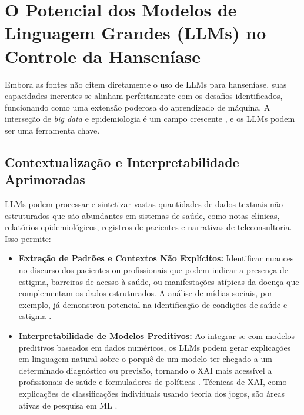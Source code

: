 \documentclass{article}
\begin{document}
\section{O Potencial dos Modelos de Linguagem Grandes (LLMs) no Controle da Hanseníase}
Embora as fontes não citem diretamente o uso de LLMs para hanseníase, suas capacidades inerentes se alinham perfeitamente com os desafios identificados, funcionando como uma extensão poderosa do aprendizado de máquina. A interseção de \textit{big data} e epidemiologia é um campo crescente \cite{tang2021intersection, goldstein2020convergence}, e os LLMs podem ser uma ferramenta chave.

\subsection{Contextualização e Interpretabilidade Aprimoradas}
LLMs podem processar e sintetizar vastas quantidades de dados textuais não estruturados que são abundantes em sistemas de saúde, como notas clínicas, relatórios epidemiológicos, registros de pacientes e narrativas de teleconsultoria. Isso permite:
\begin{itemize}
    \item \textbf{Extração de Padrões e Contextos Não Explícitos:} Identificar nuances no discurso dos pacientes ou profissionais que podem indicar a presença de estigma, barreiras de acesso à saúde, ou manifestações atípicas da doença que complementam os dados estruturados. A análise de mídias sociais, por exemplo, já demonstrou potencial na identificação de condições de saúde e estigma \cite{bigdata_review, saldanha2021ciencia}.
    \item \textbf{Interpretabilidade de Modelos Preditivos:} Ao integrar-se com modelos preditivos baseados em dados numéricos, os LLMs podem gerar explicações em linguagem natural sobre o porquê de um modelo ter chegado a um determinado diagnóstico ou previsão, tornando o XAI mais acessível a profissionais de saúde e formuladores de políticas \cite{bigdata_review, inovacao_computacional_hanseniase}. Técnicas de XAI, como explicações de classificações individuais usando teoria dos jogos, são áreas ativas de pesquisa em ML \cite{journalpcbi}.
\end{itemize}
\end{document}
